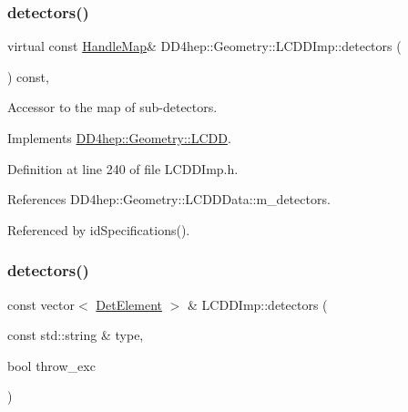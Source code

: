\hypertarget{class_d_d4hep_1_1_geometry_1_1_l_c_d_d_imp_aef76d7cbfc6be684d48d1bc1801f9319}{}\label{class_d_d4hep_1_1_geometry_1_1_l_c_d_d_imp_aef76d7cbfc6be684d48d1bc1801f9319} 
\subsubsection{\texorpdfstring{detectors()}{detectors()}\hspace{0.1cm}{\footnotesize\ttfamily [1/4]}}
{\footnotesize\ttfamily virtual const \hyperlink{class_d_d4hep_1_1_geometry_1_1_l_c_d_d_a05cb11e7355772c7b0794bcca59bf477}{Handle\+Map}\& D\+D4hep\+::\+Geometry\+::\+L\+C\+D\+D\+Imp\+::detectors (\begin{DoxyParamCaption}{ }\end{DoxyParamCaption}) const\hspace{0.3cm}{\ttfamily [inline]}, {\ttfamily [virtual]}}



Accessor to the map of sub-\/detectors. 



Implements \hyperlink{class_d_d4hep_1_1_geometry_1_1_l_c_d_d_ad06f71146140dc2682bc586ba7bffeaf}{D\+D4hep\+::\+Geometry\+::\+L\+C\+DD}.



Definition at line 240 of file L\+C\+D\+D\+Imp.\+h.



References D\+D4hep\+::\+Geometry\+::\+L\+C\+D\+D\+Data\+::m\+\_\+detectors.



Referenced by id\+Specifications().

\hypertarget{class_d_d4hep_1_1_geometry_1_1_l_c_d_d_imp_afbdc8547ce8343cdff56430acff2baeb}{}\label{class_d_d4hep_1_1_geometry_1_1_l_c_d_d_imp_afbdc8547ce8343cdff56430acff2baeb} 
\subsubsection{\texorpdfstring{detectors()}{detectors()}\hspace{0.1cm}{\footnotesize\ttfamily [2/4]}}
{\footnotesize\ttfamily const vector$<$ \hyperlink{class_d_d4hep_1_1_geometry_1_1_det_element}{Det\+Element} $>$ \& L\+C\+D\+D\+Imp\+::detectors (\begin{DoxyParamCaption}\item[{const std\+::string \&}]{type,  }\item[{bool}]{throw\+\_\+exc }\end{DoxyParamCaption})\hspace{0.3cm}{\ttfamily [virtual]}}



